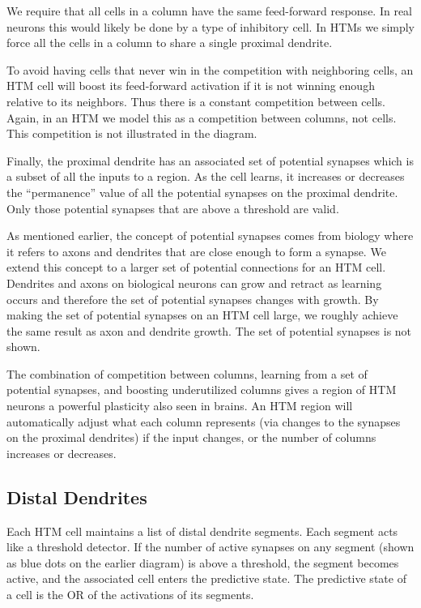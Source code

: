 \documentclass{report}
\begin{document}
We require that all cells in a column have the same feed-forward
response. In real neurons this would likely be done by a type of
inhibitory cell. In HTMs we simply force all the cells in a column to
share a single proximal dendrite.

To avoid having cells that never win in the competition with
neighboring cells, an HTM cell will boost its feed-forward activation
if it is not winning enough relative to its neighbors. Thus there is a
constant competition between cells. Again, in an HTM we model this as
a competition between columns, not cells. This competition is not
illustrated in the diagram.

Finally, the proximal dendrite has an associated set of potential
synapses which is a subset of all the inputs to a region. As the cell
learns, it increases or decreases the ``permanence'' value of all the
potential synapses on the proximal dendrite. Only those potential
synapses that are above a threshold are valid.

As mentioned earlier, the concept of potential synapses comes from
biology where it refers to axons and dendrites that are close enough
to form a synapse. We extend this concept to a larger set of potential
connections for an HTM cell. Dendrites and axons on biological neurons
can grow and retract as learning occurs and therefore the set of
potential synapses changes with growth. By making the set of potential
synapses on an HTM cell large, we roughly achieve the same result as
axon and dendrite growth. The set of potential synapses is not shown.

The combination of competition between columns, learning from a set of
potential synapses, and boosting underutilized columns gives a region
of HTM neurons a powerful plasticity also seen in brains. An HTM
region will automatically adjust what each column represents (via
changes to the synapses on the proximal dendrites) if the input
changes, or the number of columns increases or decreases.

\subsection*{Distal Dendrites}
Each HTM cell maintains a list of distal dendrite segments. Each
segment acts like a threshold detector. If the number of active
synapses on any segment (shown as blue dots on the earlier diagram) is
above a threshold, the segment becomes active, and the associated cell
enters the predictive state. The predictive state of a cell is the OR
of the activations of its segments.
\end{document}
